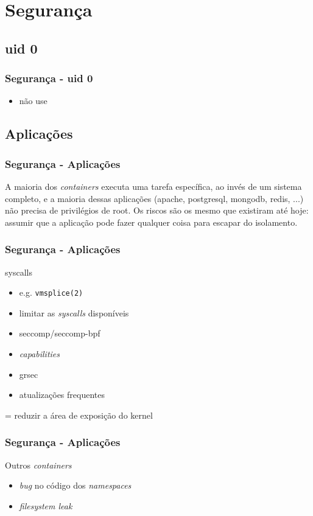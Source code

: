 \documentclass{beamer}
\begin{document}
\section{Segurança}

\subsection{uid 0}

\begin{frame}
    \frametitle{Segurança - uid 0}
    \begin{itemize}
        \item não use
    \end{itemize}
\end{frame}

\subsection{Aplicações}

\begin{frame}
    \frametitle{Segurança - Aplicações}
    A maioria dos \textit{containers} executa uma tarefa específica, ao invés
    de um sistema completo, e a maioria dessas aplicações (apache, postgresql,
    mongodb, redis, ...) não precisa de privilégios de root. Os riscos são os
    mesmo que existiram até hoje: assumir que a aplicação pode fazer qualquer
    coisa para escapar do isolamento.
\end{frame}

\begin{frame}
    \frametitle{Segurança - Aplicações}
    syscalls
    \begin{itemize}
        \item e.g. \texttt{vmsplice(2)}
        \item limitar as \textit{syscalls} disponíveis
        \item seccomp/seccomp-bpf
        \item \textit{capabilities}
        \item grsec
        \item atualizações frequentes
    \end{itemize}
    = reduzir a área de exposição do kernel
\end{frame}

\begin{frame}
    \frametitle{Segurança - Aplicações}
    Outros \textit{containers}
    \begin{itemize}
        \item \textit{bug} no código dos \textit{namespaces}
        \item \textit{filesystem leak}
    \end{itemize}
\end{frame}
\end{document}
